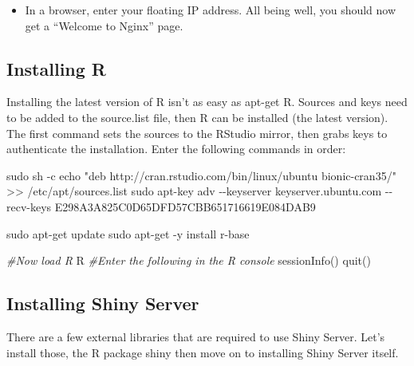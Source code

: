 \documentclass[
]{book}
\newenvironment{Shaded}{\begin{snugshade}}{\end{snugshade}}
\newcommand{\AttributeTok}[1]{\textcolor[rgb]{0.77,0.63,0.00}{#1}}
\newcommand{\CommentTok}[1]{\textcolor[rgb]{0.56,0.35,0.01}{\textit{#1}}}
\newcommand{\ExtensionTok}[1]{#1}
\newcommand{\FunctionTok}[1]{\textcolor[rgb]{0.00,0.00,0.00}{#1}}
\newcommand{\NormalTok}[1]{#1}
\newcommand{\StringTok}[1]{\textcolor[rgb]{0.31,0.60,0.02}{#1}}
\providecommand{\tightlist}{%
  \setlength{\itemsep}{0pt}\setlength{\parskip}{0pt}}
\begin{document}
\begin{itemize}
\tightlist
\item
  In a browser, enter your floating IP address. All being well, you should now get a ``Welcome to Nginx'' page.
\end{itemize}

\hypertarget{installing-r}{%
\subsection{Installing R}\label{installing-r}}

Installing the latest version of R isn't as easy as apt-get R. Sources and keys need to be added to the source.list file, then R can be installed (the latest version). The first command sets the sources to the RStudio mirror, then grabs keys to authenticate the installation. Enter the following commands in order:

\begin{Shaded}
\begin{Highlighting}[]

\FunctionTok{sudo}\NormalTok{ sh }\AttributeTok{{-}c} \StringTok{\textquotesingle{}echo "deb http://cran.rstudio.com/bin/linux/ubuntu bionic{-}cran35/" \textgreater{}\textgreater{} /etc/apt/sources.list\textquotesingle{}}
\FunctionTok{sudo}\NormalTok{ apt{-}key adv }\AttributeTok{{-}{-}keyserver}\NormalTok{ keyserver.ubuntu.com }\AttributeTok{{-}{-}recv{-}keys}\NormalTok{ E298A3A825C0D65DFD57CBB651716619E084DAB9}

\FunctionTok{sudo}\NormalTok{ apt{-}get update}
\FunctionTok{sudo}\NormalTok{ apt{-}get }\AttributeTok{{-}y}\NormalTok{ install r{-}base}


\CommentTok{\#Now load R}
\ExtensionTok{R}
\CommentTok{\#Enter the following in the R console}
\FunctionTok{sessionInfo()}
\FunctionTok{quit()}
\end{Highlighting}
\end{Shaded}

\hypertarget{installing-shiny-server}{%
\subsection{Installing Shiny Server}\label{installing-shiny-server}}

There are a few external libraries that are required to use Shiny Server. Let's install those, the R package shiny then move on to installing Shiny Server itself.
\end{document}
